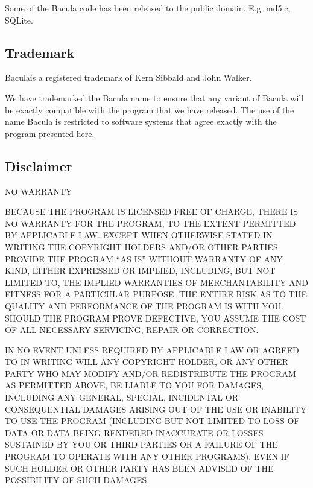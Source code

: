 Some of the Bacula code has been released to the public domain. E.g. md5.c,
SQLite. 

\subsection*{Trademark}

Bacula\raisebox{.6ex}{\textsuperscript{\textregistered}}is a registered
trademark of Kern Sibbald and John Walker. 

We have trademarked the Bacula name to ensure that any variant of Bacula will
be exactly compatible with the program that we have released. The use of the
name Bacula is restricted to software systems that agree exactly with the
program presented here. 

\subsection*{Disclaimer}

NO WARRANTY 

BECAUSE THE PROGRAM IS LICENSED FREE OF CHARGE, THERE IS NO WARRANTY FOR THE
PROGRAM, TO THE EXTENT PERMITTED BY APPLICABLE LAW. EXCEPT WHEN OTHERWISE
STATED IN WRITING THE COPYRIGHT HOLDERS AND/OR OTHER PARTIES PROVIDE THE
PROGRAM ``AS IS'' WITHOUT WARRANTY OF ANY KIND, EITHER EXPRESSED OR IMPLIED,
INCLUDING, BUT NOT LIMITED TO, THE IMPLIED WARRANTIES OF MERCHANTABILITY AND
FITNESS FOR A PARTICULAR PURPOSE. THE ENTIRE RISK AS TO THE QUALITY AND
PERFORMANCE OF THE PROGRAM IS WITH YOU. SHOULD THE PROGRAM PROVE DEFECTIVE,
YOU ASSUME THE COST OF ALL NECESSARY SERVICING, REPAIR OR CORRECTION. 

IN NO EVENT UNLESS REQUIRED BY APPLICABLE LAW OR AGREED TO IN WRITING WILL ANY
COPYRIGHT HOLDER, OR ANY OTHER PARTY WHO MAY MODIFY AND/OR REDISTRIBUTE THE
PROGRAM AS PERMITTED ABOVE, BE LIABLE TO YOU FOR DAMAGES, INCLUDING ANY
GENERAL, SPECIAL, INCIDENTAL OR CONSEQUENTIAL DAMAGES ARISING OUT OF THE USE
OR INABILITY TO USE THE PROGRAM (INCLUDING BUT NOT LIMITED TO LOSS OF DATA OR
DATA BEING RENDERED INACCURATE OR LOSSES SUSTAINED BY YOU OR THIRD PARTIES OR
A FAILURE OF THE PROGRAM TO OPERATE WITH ANY OTHER PROGRAMS), EVEN IF SUCH
HOLDER OR OTHER PARTY HAS BEEN ADVISED OF THE POSSIBILITY OF SUCH DAMAGES. 
